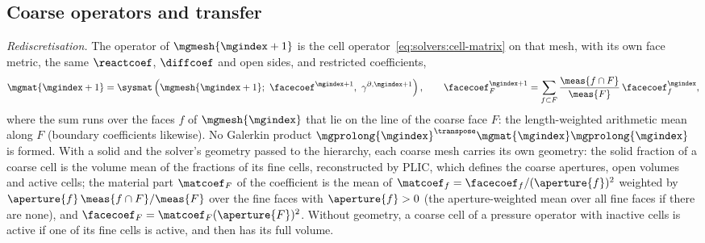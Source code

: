 \subsection{Coarse operators and transfer}\label{sec:solvers:transfer}
\emph{Rediscretisation.} The operator of $\mgmesh{\mgindex+1}$ is the cell
operator~\cref{eq:solvers:cell-matrix} on that mesh, with its own face metric,
the same $\reactcoef$, $\diffcoef$ and open sides, and restricted coefficients,
\begin{equation}\label{eq:solvers:coarse-operator}
  \mgmat{\mgindex+1}=\sysmat\roundpar{\mgmesh{\mgindex+1};\ \facecoef^{\mgindex+1},\ \gamma^{\partial,\mgindex+1}},
  \qquad
  \facecoef^{\mgindex+1}_F=\sum_{f\subset F}\frac{\meas{f\cap F}}{\meas{F}}\,\facecoef^{\mgindex}_f,
\end{equation}
where the sum runs over the faces $f$ of $\mgmesh{\mgindex}$ that lie on the
line of the coarse face $F$: the length-weighted arithmetic mean along $F$
(boundary coefficients likewise). No Galerkin product
${\mgprolong{\mgindex}}^{\transpose}\mgmat{\mgindex}\mgprolong{\mgindex}$ is
formed. With a solid and the solver's geometry passed to the hierarchy, each
coarse mesh carries its own geometry: the solid fraction of a coarse cell is
the volume mean of the fractions of its fine cells, reconstructed by PLIC,
which defines the coarse apertures, open volumes and active cells; the
material part $\matcoef_F$ of the coefficient is the mean of
$\matcoef_f=\facecoef_f/(\aperture{f})^2$ weighted by
$\aperture{f}\,\meas{f\cap F}/\meas{F}$ over the fine faces with
$\aperture{f}>0$ (the aperture-weighted mean over all fine faces if there are
none), and $\facecoef_F=\matcoef_F(\aperture{F})^2$. Without geometry, a coarse
cell of a pressure operator with inactive cells is active if one of its fine
cells is active, and then has its full volume.

